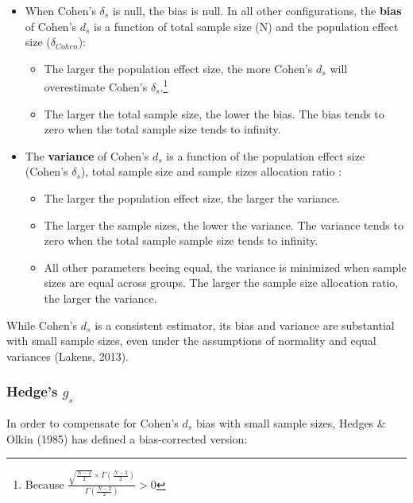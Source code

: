 \documentclass[
  man,floatsintext]{apa6}
\providecommand{\tightlist}{%
  \setlength{\itemsep}{0pt}\setlength{\parskip}{0pt}}
\begin{document}
\begin{itemize}
\tightlist
\item
  When Cohen's \(\delta_s\) is null, the bias is null. In all other configurations, the \textbf{bias} of Cohen's \(d_s\) is a function of total sample size (N) and the population effect size (\(\delta_{Cohen}\)):

  \begin{itemize}
  \tightlist
  \item
    The larger the population effect size, the more Cohen's \(d_s\) will overestimate Cohen's \(\delta_s\).\footnote{Because  $\frac{\sqrt{\frac{N-2}{2}} \times \Gamma(\frac{N-3}{2})}{\Gamma(\frac{N-2}{2})} > 0$}\\
  \item
    The larger the total sample size, the lower the bias. The bias tends to zero when the total sample size tends to infinity.
  \end{itemize}
\item
  The \textbf{variance} of Cohen's \(d_s\) is a function of the population effect size (Cohen's \(\delta_s\)), total sample size and sample sizes allocation ratio :

  \begin{itemize}
  \tightlist
  \item
    The larger the population effect size, the larger the variance.
  \item
    The larger the sample sizes, the lower the variance. The variance tends to zero when the total sample sample size tends to infinity.\\
  \item
    All other parameters beeing equal, the variance is minimized when sample sizes are equal across groups. The larger the sample size allocation ratio, the larger the variance.
  \end{itemize}
\end{itemize}

While Cohen's \(d_s\) is a consistent estimator, its bias and variance are substantial with small sample sizes, even under the assumptions of normality and equal variances (Lakens, 2013).

\hypertarget{hedges-g_s}{%
\subsubsection{\texorpdfstring{Hedge's \(g_s\)}{Hedge's g\_s}}\label{hedges-g_s}}

In order to compensate for Cohen's \(d_s\) bias with small sample sizes, Hedges \& Olkin (1985) has defined a bias-corrected version:
\end{document}
